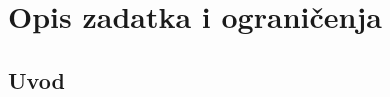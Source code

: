 \documentclass[11pt,a4paper,openright]{report}
\begin{document}
\tableofcontents
\listoftables	%
\listoffigures	%
\newpage


\chapter{Opis zadatka i ograničenja}\label{OpisIOgranicenja}
\section{Uvod}

\newpage
\nocite{*}


\newpage
\appendix
\end{document}
